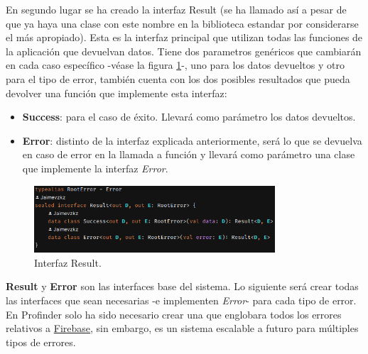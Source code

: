 En segundo lugar se ha creado la interfaz Result (se ha llamado así a pesar de que ya haya una clase con este nombre en la biblioteca estandar por considerarse el más apropiado). Esta es la interfaz principal que utilizan todas las funciones de la aplicación que devuelvan datos. Tiene dos parametros genéricos que cambiarán en cada caso específico -véase la figura \ref{fig:ejemplo_result}-, uno para los datos devueltos y otro para el tipo de error, también cuenta con los dos posibles resultados que pueda devolver una función que implemente esta interfaz: 
\begin{itemize}
    \item \textbf{Success}: para el caso de éxito. Llevará como parámetro los datos devueltos.
    \item \textbf{Error}: distinto de la interfaz explicada anteriormente, será lo que se devuelva en caso de error en la llamada a función y llevará como parámetro una clase que implemente la interfaz \textit{Error}.
\end{itemize}
\newpage
\begin{figure}[h]
    \centering
    \includegraphics[width = 0.8\textwidth]{Imagenes/Fuentes/ejemplo_result.png}
    \caption{Interfaz Result.}
    \label{fig:ejemplo_result}
\end{figure}

\textbf{Result} y \textbf{Error} son las interfaces base del sistema. Lo siguiente será crear todas las interfaces que sean necesarias -e implementen \textit{Error}- para cada tipo de error. En Profinder solo ha sido necesario crear una que englobara todos los errores relativos a \hyperlink{subsec:firebase}{Firebase}, sin embargo, es un sistema escalable a futuro para múltiples tipos de errores.

